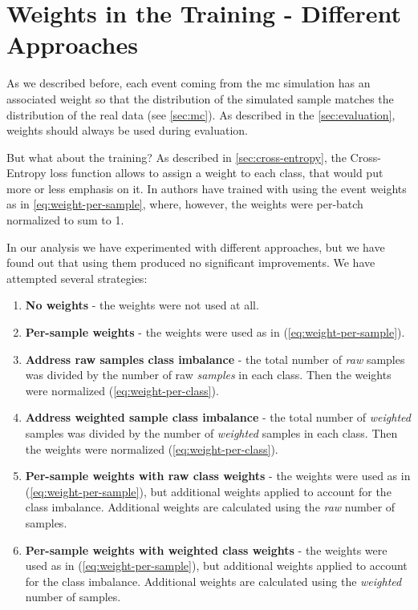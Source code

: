 \section{Weights in the Training - Different Approaches}
\label{sec:weights}

As we described before, each event coming from the \gls{mc} simulation has an associated weight so that the distribution
of the simulated sample matches the distribution of the real data (see \autoref{sec:mc}). As described in the
\autoref{sec:evaluation}, weights should always be used during evaluation.

But what about the training? As described in \autoref{sec:cross-entropy}, the Cross-Entropy loss function allows to
assign a weight to each class, that would put more or less emphasis on it. In \cite{jan} authors have trained with
using the event weights as in \autoref{eq:weight-per-sample}, where, however, the weights were per-batch normalized to
sum to 1.

In our analysis we have experimented with different approaches, but we have found out that using them produced no
significant improvements. We have attempted several strategies:

\begin{enumerate}
    \item \textbf{No weights} - the weights were not used at all.
    \item \textbf{Per-sample weights} - the weights were used as in \cite{jan} (\autoref{eq:weight-per-sample}).
    \item \textbf{Address raw samples class imbalance} - the total number of \emph{raw} samples was divided by the
          number of raw \emph{samples} in each class. Then the weights were normalized (\autoref{eq:weight-per-class}).
    \item \textbf{Address weighted sample class imbalance} - the total number of \emph{weighted} samples was divided by
          the number of \emph{weighted} samples in each class. Then the weights were normalized
          (\autoref{eq:weight-per-class}).
    \item \textbf{Per-sample weights with raw class weights} - the weights were used as in \cite{jan}
          (\autoref{eq:weight-per-sample}), but additional weights applied to account for the class imbalance.
          Additional weights are calculated using the \emph{raw} number of samples.
    \item \textbf{Per-sample weights with weighted class weights} - the weights were used as in \cite{jan}
          (\autoref{eq:weight-per-sample}), but additional weights applied to account for the class imbalance.
          Additional weights are calculated using the \emph{weighted} number of samples.
\end{enumerate}


